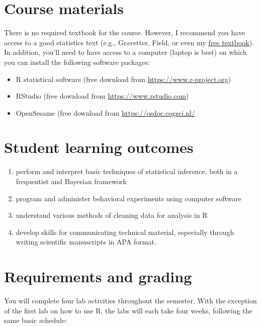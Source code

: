 \documentclass[10pt]{article}
\begin{document}
\section*{Course materials}
\label{sec:org2b6d63f}

There is no required textbook for the course. However, I recommend you have access to a good statistics text (e.g., Gravetter, Field, or even my \href{https://learnstatswithjasp.com}{free textbook}).  In addition, you'll need to have access to a computer (laptop is best) on which you can install the following software packages:

\begin{itemize}
\item R statistical software (free download from \href{http://www.r-project.org}{https://www.r-project.org})
\item RStudio (free download from \href{http://www.rstudio.com}{https://www.rstudio.com})
\item OpenSesame (free download from \url{https://osdoc.cogsci.nl/}
\end{itemize}

\section*{Student learning outcomes}
\label{sec:org38cec5c}

\begin{enumerate}
\item perform and interpret basic techniques of statistical inference, both in a frequentist and Bayesian framework
\item program and administer behavioral experiments using computer software
\item understand various methods of cleaning data for analysis in R
\item develop skills for communicating technical material, especially through writing scientific manuscripts in APA format.
\end{enumerate}

\section*{Requirements and grading}
\label{sec:orgc048f7b}

You will complete four lab activities throughout the semester. With the exception of the first lab on how to use R, the labs will each take four weeks, following the same basic schedule:
\end{document}
